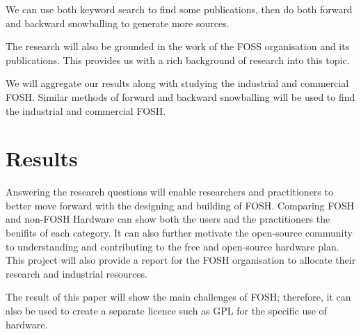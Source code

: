 \documentclass{article}
\begin{document}
We can use both keyword search to find some publications, then do both forward and backward snowballing to generate more sources.

The research will also be grounded in the work of the FOSS organisation and its publications.
This provides us with a rich background of research into this topic.

We will aggregate our results along with studying the industrial and commercial FOSH.
Similar methods of forward and backward snowballing will be used to find the industrial and commercial FOSH.

\section{Results}
Answering the research questions will enable researchers and practitioners to better move forward with the designing and building of FOSH.
Comparing FOSH and non-FOSH Hardware can show both the users and the practitioners the benifits of each category.
It can also further motivate the open-source community to understanding and contributing to the free and open-source hardware plan.
This project will also provide a report for the FOSH organisation to allocate their research and industrial resources.

The result of this paper will show the main challenges of FOSH; therefore, it can also be used to create a separate licence such as GPL for the specific use of hardware.

\end{document}
